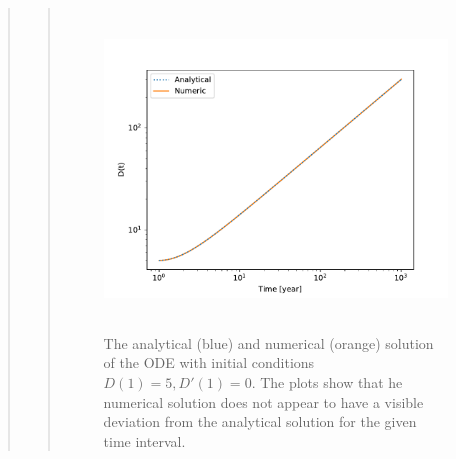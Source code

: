 \begin{quote}
\begin{quote}
\begin{figure}[!ht]
\centering
\includegraphics[width=14cm, height=8.5cm]{./Plots/3_ode_2.pdf}
\caption{The analytical (blue) and numerical (orange) solution of the ODE with initial conditions $D(1) = 5,  D'(1) = 0$. The plots show that he numerical solution does not appear to have a visible deviation from the analytical solution for the given time interval.}
\end{figure}

\end{quote}
\end{quote}






